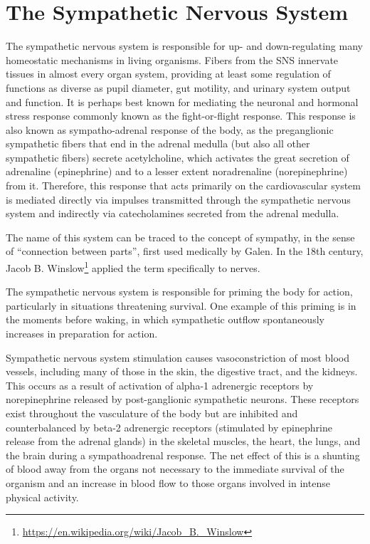 \documentclass[]{book}
\let\rmarkdownfootnote\footnote%
\def\footnote{\protect\rmarkdownfootnote}
\renewcommand{\href}[2]{#2\footnote{\url{#1}}}
\begin{document}
\hypertarget{the-sympathetic-nervous-system}{%
\section{The Sympathetic Nervous System}\label{the-sympathetic-nervous-system}}

The sympathetic nervous system is responsible for up- and down-regulating many homeostatic mechanisms in living organisms. Fibers from the SNS innervate tissues in almost every organ system, providing at least some regulation of functions as diverse as pupil diameter, gut motility, and urinary system output and function. It is perhaps best known for mediating the neuronal and hormonal stress response commonly known as the fight-or-flight response. This response is also known as sympatho-adrenal response of the body, as the preganglionic sympathetic fibers that end in the adrenal medulla (but also all other sympathetic fibers) secrete acetylcholine, which activates the great secretion of adrenaline (epinephrine) and to a lesser extent noradrenaline (norepinephrine) from it. Therefore, this response that acts primarily on the cardiovascular system is mediated directly via impulses transmitted through the sympathetic nervous system and indirectly via catecholamines secreted from the adrenal medulla.

The name of this system can be traced to the concept of sympathy, in the sense of ``connection between parts'', first used medically by Galen. In the 18th century, \href{https://en.wikipedia.org/wiki/Jacob_B._Winslow}{Jacob B. Winslow} applied the term specifically to nerves.

The sympathetic nervous system is responsible for priming the body for action, particularly in situations threatening survival. One example of this priming is in the moments before waking, in which sympathetic outflow spontaneously increases in preparation for action.

Sympathetic nervous system stimulation causes vasoconstriction of most blood vessels, including many of those in the skin, the digestive tract, and the kidneys. This occurs as a result of activation of alpha-1 adrenergic receptors by norepinephrine released by post-ganglionic sympathetic neurons. These receptors exist throughout the vasculature of the body but are inhibited and counterbalanced by beta-2 adrenergic receptors (stimulated by epinephrine release from the adrenal glands) in the skeletal muscles, the heart, the lungs, and the brain during a sympathoadrenal response. The net effect of this is a shunting of blood away from the organs not necessary to the immediate survival of the organism and an increase in blood flow to those organs involved in intense physical activity.
\end{document}
